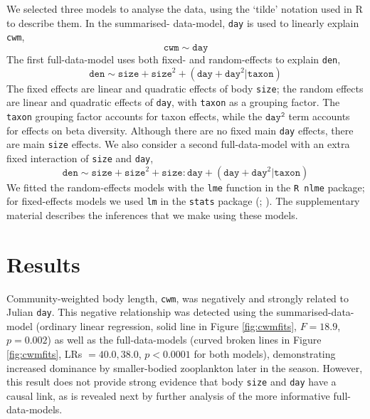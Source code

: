 \documentclass[12pt]{ecology}
\begin{document}
We selected three models to analyse the data, using the \citet{WilkinsonAndRogers1973} `tilde' notation used in R to describe them.  In the summarised- data-model, \texttt{day} is used to linearly explain \texttt{cwm},
\begin{equation}
\mathtt{cwm} \sim \mathtt{day}
\label{eq:sdm}
\end{equation}
The first full-data-model uses both fixed- and random-effects to explain \texttt{den},
\begin{equation}
\mathtt{den} \sim \mathtt{size} + \mathtt{size}^2 + (\mathtt{day} + \mathtt{day}^2 | \mathtt{taxon})
\label{eq:fdmnointeraction}
\end{equation}
The fixed effects are linear and quadratic effects of body \texttt{size}; the random effects are linear and quadratic effects of \texttt{day}, with \texttt{taxon} as a grouping factor.  The \texttt{taxon} grouping factor accounts for taxon effects, while the $\mathtt{day^2}$ term accounts for effects on beta diversity.  Although there are no fixed main \texttt{day} effects, there are main \texttt{size} effects.  We also consider a second full-data-model with an extra fixed interaction of \texttt{size} and \texttt{day},
\begin{equation}
\mathtt{den} \sim \mathtt{size} + \mathtt{size}^2 + \mathtt{size:day} + (\mathtt{day} + \mathtt{day}^2 | \mathtt{taxon})
\label{eq:fdminteraction}
\end{equation}
We fitted the random-effects models with the \texttt{lme} function in the \texttt{R nlme} package; for fixed-effects models we used \texttt{lm} in the \texttt{stats} package (; ).  The supplementary material describes the inferences that we make using these models.

\section{Results}

Community-weighted body length, \texttt{cwm}, was negatively and strongly related to Julian \texttt{day}.  This negative relationship was detected using the summarised-data-model (ordinary linear regression, solid line in Figure \ref{fig:cwmfits}, $F = 18.9$, $p = 0.002$) as well as the full-data-models (curved broken lines in Figure \ref{fig:cwmfits}, LRs $= 40.0, 38.0$, $p < 0.0001$ for both models), demonstrating increased dominance by smaller-bodied zooplankton later in the season.  However, this result does not provide strong evidence that body \texttt{size} and \texttt{day} have a causal link, as is revealed next by further analysis of the more informative full-data-models.
\end{document}
